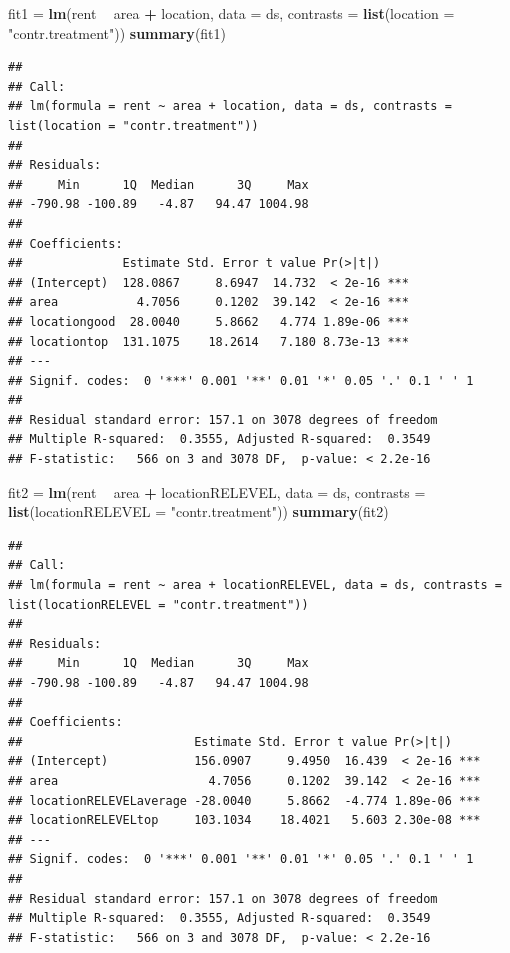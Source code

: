 \documentclass[10pt,ignorenonframetext,]{beamer}
\newenvironment{Shaded}{\begin{snugshade}}{\end{snugshade}}
\newcommand{\KeywordTok}[1]{\textcolor[rgb]{0.13,0.29,0.53}{\textbf{#1}}}
\newcommand{\DataTypeTok}[1]{\textcolor[rgb]{0.13,0.29,0.53}{#1}}
\newcommand{\StringTok}[1]{\textcolor[rgb]{0.31,0.60,0.02}{#1}}
\newcommand{\OperatorTok}[1]{\textcolor[rgb]{0.81,0.36,0.00}{\textbf{#1}}}
\newcommand{\NormalTok}[1]{#1}
\begin{document}
\begin{frame}[fragile]

\begin{Shaded}
\begin{Highlighting}[]
\NormalTok{fit1 =}\StringTok{ }\KeywordTok{lm}\NormalTok{(rent }\OperatorTok{~}\StringTok{ }\NormalTok{area }\OperatorTok{+}\StringTok{ }\NormalTok{location, }\DataTypeTok{data =}\NormalTok{ ds, }\DataTypeTok{contrasts =} \KeywordTok{list}\NormalTok{(}\DataTypeTok{location =} \StringTok{"contr.treatment"}\NormalTok{))}
\KeywordTok{summary}\NormalTok{(fit1)}
\end{Highlighting}
\end{Shaded}

\begin{verbatim}
## 
## Call:
## lm(formula = rent ~ area + location, data = ds, contrasts = list(location = "contr.treatment"))
## 
## Residuals:
##     Min      1Q  Median      3Q     Max 
## -790.98 -100.89   -4.87   94.47 1004.98 
## 
## Coefficients:
##              Estimate Std. Error t value Pr(>|t|)    
## (Intercept)  128.0867     8.6947  14.732  < 2e-16 ***
## area           4.7056     0.1202  39.142  < 2e-16 ***
## locationgood  28.0040     5.8662   4.774 1.89e-06 ***
## locationtop  131.1075    18.2614   7.180 8.73e-13 ***
## ---
## Signif. codes:  0 '***' 0.001 '**' 0.01 '*' 0.05 '.' 0.1 ' ' 1
## 
## Residual standard error: 157.1 on 3078 degrees of freedom
## Multiple R-squared:  0.3555, Adjusted R-squared:  0.3549 
## F-statistic:   566 on 3 and 3078 DF,  p-value: < 2.2e-16
\end{verbatim}

\begin{Shaded}
\begin{Highlighting}[]
\NormalTok{fit2 =}\StringTok{ }\KeywordTok{lm}\NormalTok{(rent }\OperatorTok{~}\StringTok{ }\NormalTok{area }\OperatorTok{+}\StringTok{ }\NormalTok{locationRELEVEL, }\DataTypeTok{data =}\NormalTok{ ds, }\DataTypeTok{contrasts =} \KeywordTok{list}\NormalTok{(}\DataTypeTok{locationRELEVEL =} \StringTok{"contr.treatment"}\NormalTok{))}
\KeywordTok{summary}\NormalTok{(fit2)}
\end{Highlighting}
\end{Shaded}

\begin{verbatim}
## 
## Call:
## lm(formula = rent ~ area + locationRELEVEL, data = ds, contrasts = list(locationRELEVEL = "contr.treatment"))
## 
## Residuals:
##     Min      1Q  Median      3Q     Max 
## -790.98 -100.89   -4.87   94.47 1004.98 
## 
## Coefficients:
##                        Estimate Std. Error t value Pr(>|t|)    
## (Intercept)            156.0907     9.4950  16.439  < 2e-16 ***
## area                     4.7056     0.1202  39.142  < 2e-16 ***
## locationRELEVELaverage -28.0040     5.8662  -4.774 1.89e-06 ***
## locationRELEVELtop     103.1034    18.4021   5.603 2.30e-08 ***
## ---
## Signif. codes:  0 '***' 0.001 '**' 0.01 '*' 0.05 '.' 0.1 ' ' 1
## 
## Residual standard error: 157.1 on 3078 degrees of freedom
## Multiple R-squared:  0.3555, Adjusted R-squared:  0.3549 
## F-statistic:   566 on 3 and 3078 DF,  p-value: < 2.2e-16
\end{verbatim}


\end{frame}
\end{document}
